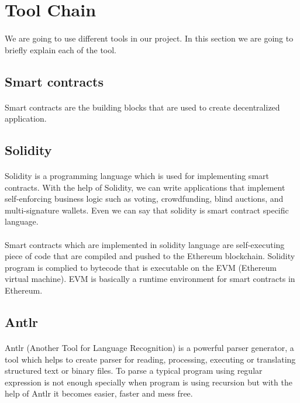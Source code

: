 \documentclass[11pt]{article}
\begin{document}
\section{Tool Chain}
\paragraph{}
We are going to use different tools in our project. In this section we are going to briefly explain each of the tool.

\subsection{Smart contracts}
\paragraph{}
Smart contracts are the building blocks that are used to create decentralized application.

\subsection{Solidity}
\paragraph{}
Solidity is a programming language which is used for implementing smart contracts. With the help of Solidity, we can write applications that implement self-enforcing business logic such as voting, crowdfunding, blind auctions, and multi-signature wallets. Even we can say that solidity is smart contract specific language.
\paragraph{}
Smart contracts which are implemented in solidity language are self-executing piece of code that are compiled and pushed to the Ethereum blockchain. Solidity program is complied to bytecode that is executable on the EVM (Ethereum virtual machine). EVM  is basically a runtime environment for smart contracts in Ethereum. 

\subsection{Antlr}
\paragraph{}
Antlr (Another Tool for Language Recognition) is a powerful parser generator, a tool which helps to create parser for reading, processing, executing or translating structured text or binary files. To parse a typical program using regular expression is not enough specially when program is using recursion but with the help of Antlr it becomes easier, faster and mess free. 
\end{document}
